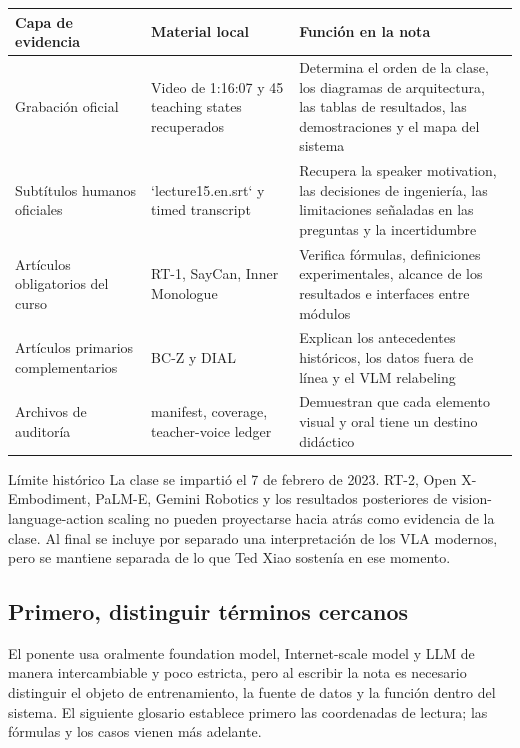 \begin{longtable}{L{0.21\textwidth}L{0.31\textwidth}L{0.38\textwidth}}
\toprule
Capa de evidencia & Material local & Función en la nota \\
\midrule
Grabación oficial & Video de 1:16:07 y 45 teaching states recuperados & Determina el orden de la clase, los diagramas de arquitectura, las tablas de resultados, las demostraciones y el mapa del sistema \\
Subtítulos humanos oficiales & `lecture15.en.srt` y timed transcript & Recupera la speaker motivation, las decisiones de ingeniería, las limitaciones señaladas en las preguntas y la incertidumbre \\
Artículos obligatorios del curso & RT-1, SayCan, Inner Monologue & Verifica fórmulas, definiciones experimentales, alcance de los resultados e interfaces entre módulos \\
Artículos primarios complementarios & BC-Z y DIAL & Explican los antecedentes históricos, los datos fuera de línea y el VLM relabeling \\
Archivos de auditoría & manifest, coverage, teacher-voice ledger & Demuestran que cada elemento visual y oral tiene un destino didáctico \\
\bottomrule
\end{longtable}

\begin{warningbox}{Límite histórico}
La clase se impartió el 7 de febrero de 2023. RT-2, Open X-Embodiment, PaLM-E, Gemini Robotics y los resultados posteriores de vision-language-action scaling no pueden proyectarse hacia atrás como evidencia de la clase. Al final se incluye por separado una interpretación de los VLA modernos, pero se mantiene separada de lo que Ted Xiao sostenía en ese momento.
\end{warningbox}

\subsection{Primero, distinguir términos cercanos}

El ponente usa oralmente foundation model, Internet-scale model y LLM de manera intercambiable y poco estricta, pero al escribir la nota es necesario distinguir el objeto de entrenamiento, la fuente de datos y la función dentro del sistema. El siguiente glosario establece primero las coordenadas de lectura; las fórmulas y los casos vienen más adelante.

